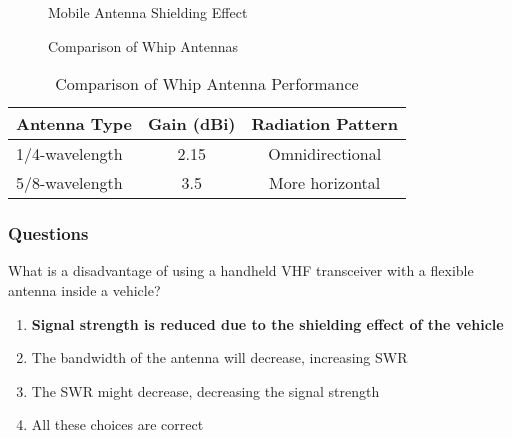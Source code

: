 \begin{figure}[h]
    \centering
    \caption{Mobile Antenna Shielding Effect}
    \label{fig:mobile-shielding}
\end{figure}

\begin{figure}[h]
    \centering
    \caption{Comparison of Whip Antennas}
    \label{fig:whip-comparison}
\end{figure}

\begin{table}[h]
    \centering
    \caption{Comparison of Whip Antenna Performance}
    \label{tab:whip-performance}
    \begin{tabular}{|l|c|c|}
        \hline
        \textbf{Antenna Type} & \textbf{Gain (dBi)} & \textbf{Radiation Pattern} \\
        \hline
        1/4-wavelength & 2.15 & Omnidirectional \\
        5/8-wavelength & 3.5 & More horizontal \\
        \hline
    \end{tabular}
\end{table}

\subsubsection*{Questions}

\begin{tcolorbox}[colback=gray!10!white,colframe=black!75!black,title={T9A07}]
    What is a disadvantage of using a handheld VHF transceiver with a flexible antenna inside a vehicle?
    \begin{enumerate}[label=\Alph*),noitemsep]
        \item \textbf{Signal strength is reduced due to the shielding effect of the vehicle}
        \item The bandwidth of the antenna will decrease, increasing SWR
        \item The SWR might decrease, decreasing the signal strength
        \item All these choices are correct
    \end{enumerate}
\end{tcolorbox}

